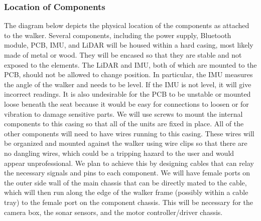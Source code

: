 \subsubsection{Location of Components}
\noindent The diagram below depicts the physical location of the components as attached to the walker. Several components, including the power supply, Bluetooth module, PCB, IMU, and LiDAR will be housed within a hard casing, most likely made of metal or wood. They will be encased so that they are stable and not exposed to the elements. The LiDAR and IMU, both of which are mounted to the PCB, should not be allowed to change position. In particular, the IMU measures the angle of the walker and needs to be level. If the IMU is not level, it will give incorrect readings. It is also undesirable for the PCB to be unstable or mounted loose beneath the seat because it would be easy for connections to loosen or for vibration to damage sensitive parts. We will use screws to mount the internal components to this casing so that all of the units are fixed in place. All of the other components will need to have wires running to this casing. These wires will be organized and mounted against the walker using wire clips so that there are no dangling wires, which could be a tripping hazard to the user and would appear unprofessional. We plan to achieve this by designing cables that can relay the necessary signals and pins to each component. We will have female ports on the outer side wall of the main chassis that can be directly mated to the cable, which will then run along the edge of the walker frame (possibly within a cable tray) to the female port on the component chassis. This will be necessary for the camera box, the sonar sensors, and the motor controller/driver chassis. \\




